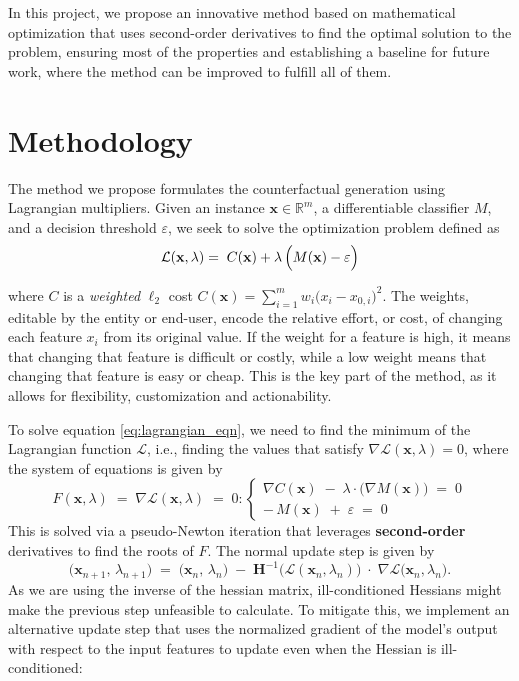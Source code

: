 \documentclass[12pt]{extarticle}
\numberwithin{equation}{section}
\begin{document}
In this project, we propose an innovative method based on mathematical optimization that uses second-order derivatives to find the optimal solution to the problem, ensuring most of the properties and establishing a baseline for future work, where the method can be improved to fulfill all of them.

\section*{Methodology}
The method we propose formulates the counterfactual generation using Lagrangian multipliers. Given an instance $\mathbf{x}\! \in\! \mathbb{R}^m$, a differentiable classifier $M$, and a decision threshold $\varepsilon$, we seek to solve the optimization problem defined as
\begin{equation}
\label{eq:lagrangian_eqn}
\mathcal{L}(\mathbf{x}, \lambda) = \; C(\mathbf{x}) + \lambda \, \Bigl(M(\mathbf{x}) - \varepsilon \Bigr)
\end{equation}

where $C$ is a \emph{weighted} $\ell_2$ cost $C(\mathbf{x}) = \sum_{i=1}^m w_i\bigl(x_i - x_{0,i}\bigr)^2$. The weights, editable by the entity or end-user, encode the relative effort, or cost, of changing each feature $x_i$ from its original value. If the weight for a feature is high, it means that changing that feature is difficult or costly, while a low weight means that changing that feature is easy or cheap. This is the key part of the method, as it allows for flexibility, customization and actionability. 

To solve equation \ref{eq:lagrangian_eqn}, we need to find the minimum of the Lagrangian function $\mathcal{L}$, i.e., finding the values that satisfy $\nabla \mathcal{L}(\mathbf{x}, \lambda) = 0$, where the system of equations is given by
\[
F(\mathbf{x}, \lambda) \;=\; \nabla \mathcal{L}(\mathbf{x}, \lambda) \;=\; 0:
\begin{cases}
\nabla C(\mathbf{x}) \;-\;\lambda \cdot \bigl(\nabla M(\mathbf{x})\bigr) \;=\; 0 \\
-\,M(\mathbf{x})\;+\;\varepsilon\;=\;0
\end{cases}
\]
This is solved via a pseudo-Newton iteration that leverages \textbf{second-order} derivatives to find the roots of $F$. The normal update step is given by
\[
\bigl(\mathbf{x}_{n+1},\,\lambda_{n+1}\bigr)
\;=\;
\bigl(\mathbf{x}_n,\,\lambda_n\bigr)
\;-\;
\mathbf{H}^{-1}\!\bigl(\mathcal{L}(\mathbf{x}_n,\lambda_n)\bigr)
\;\cdot\;
\nabla\mathcal{L}\bigl(\mathbf{x}_n,\lambda_n\bigr).
\]
As we are using the inverse of the hessian matrix, ill-conditioned Hessians might make the previous step unfeasible to calculate. To mitigate this, we implement an alternative update step that uses the normalized gradient of the model's output with respect to the input features to update even when the Hessian is ill-conditioned:
\end{document}
